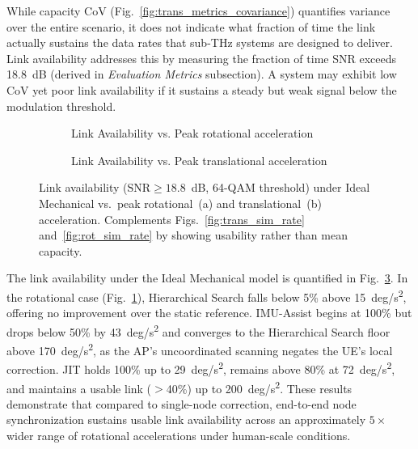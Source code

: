 \documentclass[fleqn,10pt]{wlscirep}
\newcommand{\rev}[1]{{\color{revblue}#1}}
\begin{document}
While capacity CoV (Fig.~\ref{fig:trans_metrics_covariance}) quantifies variance over the entire scenario, it does not indicate what fraction of time the link actually sustains the data rates that sub-THz systems are designed to deliver\cite{Dang2020, Nokia2022}. Link availability addresses this by measuring the fraction of time SNR exceeds \SI{18.8}{dB} (derived in \textit{Evaluation Metrics} subsection). A system may exhibit low CoV yet poor link availability if it sustains a steady but weak signal below the modulation threshold.

\begin{figure}[h!]
    \centering
    \begin{subfigure}{0.495\linewidth}
        
        \vspace{-25pt}
        \caption{Link Availability vs. Peak rotational acceleration}
        \label{fig:rotionalLinkAvail}
    \end{subfigure}
    \hfill
    \begin{subfigure}{0.495\linewidth}
        
        \vspace{-25pt}
        \caption{Link Availability vs. Peak translational acceleration}
        \label{fig:translationalLinkAvail}
    \end{subfigure}
    \caption{Link availability ($\mathrm{SNR} \geq 18.8$~dB, 64-QAM threshold) under Ideal Mechanical vs.\ peak rotational~(a) and translational~(b) acceleration. Complements Figs.~\ref{fig:trans_sim_rate} and~\ref{fig:rot_sim_rate} by showing usability rather than mean capacity.}
    \label{fig:accelLinkAvail}
    \vspace{-5pt}
\end{figure}

The link availability under the Ideal Mechanical model is quantified in Fig.~\ref{fig:accelLinkAvail}. In the rotational case (Fig.~\ref{fig:rotionalLinkAvail}), Hierarchical Search falls below 5\% above \SI{15}{deg/s^2}, offering no improvement over the static reference. IMU-Assist begins at 100\% but drops below 50\% by \SI{43}{deg/s^2} and converges to the Hierarchical Search floor above \SI{170}{deg/s^2}, as the AP's uncoordinated scanning negates the UE's local correction. JIT holds 100\% up to \SI{29}{deg/s^2}, remains above 80\% at \SI{72}{deg/s^2}, and maintains a usable link ($>$40\%) up to \SI{200}{deg/s^2}. These results demonstrate that compared to single-node correction, end-to-end node synchronization sustains usable link availability across an approximately \rev{$5\times$} wider range of rotational accelerations under human-scale conditions.
\end{document}
